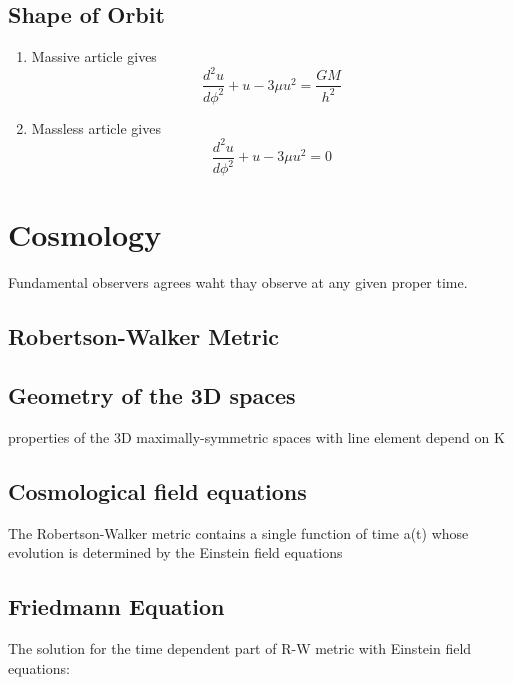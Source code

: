 \documentclass[12pt,a4paper]{article}
\begin{document}
\subsection{Shape of Orbit}
    \begin{enumerate}
        \item Massive article gives
        \begin{equation}
            \frac{d^2 u}{d\phi^2} + u -3 \mu u^2 = \frac{GM}{h^2}
        \end{equation}
        \item Massless article gives
        \begin{equation}
            \frac{d^2 u}{d\phi^2} + u -3 \mu u^2 = 0
        \end{equation}
    \end{enumerate}
\section{Cosmology}
Fundamental observers agrees waht thay observe at any given proper time.

\subsection{Robertson-Walker Metric}
\subsection{Geometry of the 3D spaces}
properties of the 3D maximally-symmetric spaces with line element depend on K
\subsection{Cosmological field equations}
The Robertson-Walker metric contains a single function of time a(t) whose evolution is determined by the Einstein field equations
\subsection{Friedmann Equation}
The solution for the time dependent part of R-W metric with Einstein field equations:

\end{document}
